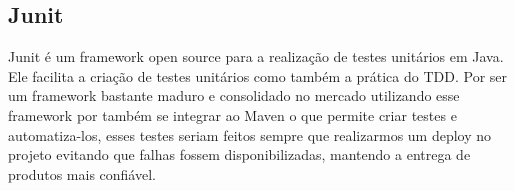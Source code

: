 \subsection{Junit}
\label{sec:junit}

Junit é um framework open source para a realização de testes unitários em Java.
Ele facilita a criação de testes unitários como também a prática do TDD. Por ser
um framework bastante maduro e consolidado no mercado utilizando esse framework
por também se integrar ao Maven o que permite criar testes e automatiza-los,
esses testes seriam feitos sempre que realizarmos um deploy no projeto evitando
que falhas fossem disponibilizadas, mantendo a entrega de produtos mais confiável.
